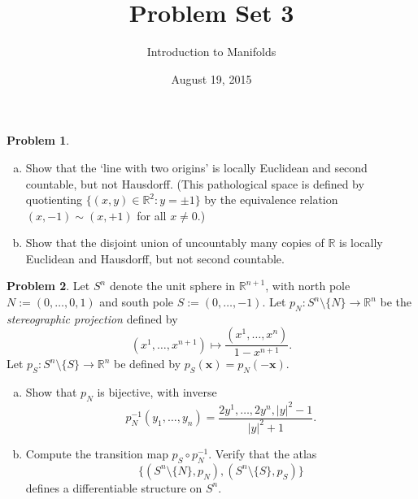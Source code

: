 \documentclass{amsart}
\newcommand{\+}[1]{\ensuremath{\mathbf{#1}}}
\newcommand{\R}{{\mathbb R}}
\theoremstyle{definition}
\newtheorem{prob}{Problem}
\begin{document}
\title{Problem Set 3}
\date{August 19, 2015}
\author{Introduction to Manifolds}

\maketitle



\begin{prob}

 \begin{enumerate}[(a)]
  \item Show that the `line with two origins' is locally Euclidean and second
  countable, but not Hausdorff.  (This pathological space
  is defined by quotienting 
  $\{(x,y) \in \R^2: y = \pm 1\}$ by the equivalence relation
  $(x,-1) \sim (x, +1)$ for all $x \neq 0$.)
  \item Show that the disjoint union of uncountably many copies
  of $\R$ is locally Euclidean and Hausdorff, but not 
  second countable.
 \end{enumerate}
\end{prob}



\begin{prob}
Let $S^n$ denote the unit sphere in $\R^{n+1}$,
with north pole $N := (0,\ldots,0,1)$ and south pole
$S := (0,\ldots,-1)$.
Let $p_N: S^n \setminus \{N\} \to \R^n$ be the \emph{stereographic projection}
defined by
\[
(x^1,\ldots,x^{n+1}) \mapsto \frac{(x^1,\ldots,x^n)}{1-x^{n+1}}.
\]
Let $p_S: S^n \setminus \{S\} \to \R^n$ be defined by
$p_S(\+x) = p_N(-\+x)$.
\begin{enumerate}[(a)]
\item Show that $p_N$ is bijective, with inverse
\[
 p_N^{-1}(y_1,\ldots,y_n) = \frac{2y^1,\ldots,2y^n,|y|^2-1}{|y|^2+1}.
\]
\item Compute the transition map $p_S \circ p_N^{-1}$.
Verify that the atlas 
\[\{(S^n \setminus \{N\},p_N),(S^n \setminus \{S\},p_S)\}\]
defines a differentiable structure on $S^n$.
\end{enumerate}
\end{prob}
\end{document}
